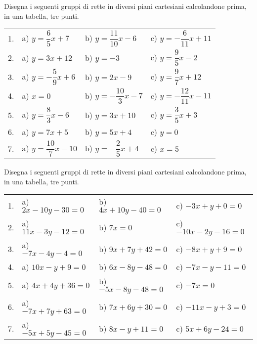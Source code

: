 \begin{esercizio}\label{ese:}
Disegna i seguenti gruppi di rette in diversi piani cartesiani 
calcolandone prima, in una tabella, tre punti.

\begin{tabular}{llll}
1. &
a) \quad \(y = \dfrac{6}{5} x +7\) & 
b) \quad \(y = \dfrac{11}{10} x -6\) & 
c) \quad \(y = -\dfrac{6}{11} x +11\) \\
2. &
a) \quad \(y = 3 x +12\) &   
b) \quad \(y = -3\) &
c) \quad \(y = \dfrac{9}{5} x -2\) \\
3. &
a) \quad \(y = -\dfrac{5}{9} x +6\) &   
b) \quad \(y = 2 x -9\) &
c) \quad \(y = \dfrac{9}{7} x +12\) \\
4. &
a) \quad \(x = 0\) &   
b) \quad \(y = -\dfrac{10}{3} x -7\) &
c) \quad \(y = -\dfrac{12}{11} x -11\) \\
5. &
a) \quad \(y = \dfrac{8}{3} x -6\) &   
b) \quad \(y = 3 x +10\) &
c) \quad \(y = \dfrac{3}{5} x +3\) \\
6. &
a) \quad \(y = 7 x +5\) &   
b) \quad \(y = 5 x +4\) &
c) \quad \(y = 0\) \\
7. &
a) \quad \(y = \dfrac{10}{7} x -10\) &   
b) \quad \(y = -\dfrac{2}{5} x +4\) &
c) \quad \(x = 5\) \\
\end{tabular}
\end{esercizio}

\vspace{-6pt}
\begin{esercizio}\label{ese:}
Disegna i seguenti gruppi di rette in diversi piani cartesiani 
calcolandone prima, in una tabella, tre punti.

\begin{tabular}{llll}
1. &
a) \quad \(2 x - 10 y - 30 = 0\) & 
b) \quad \(4 x + 10 y - 40 = 0\) & 
c) \quad \(-3 x + y + 0 = 0\) \\
2. &
a) \quad \(11 x - 3 y - 12 = 0\) &   
b) \quad \(7 x = 0\) &
c) \quad \(-10 x - 2 y - 16 = 0\) \\
3. &
a) \quad \(-7 x - 4 y - 4 = 0\) &   
b) \quad \(9 x + 7 y + 42 = 0\) &
c) \quad \(-8 x + y + 9 = 0\) \\
4. &
a) \quad \(10 x - y + 9 = 0\) &   
b) \quad \(6 x - 8 y - 48 = 0\) &
c) \quad \(-7 x - y - 11 = 0\) \\
5. &
a) \quad \(4 x + 4 y + 36 = 0\) &   
b) \quad \(-5 x - 8 y - 48 = 0\) &
c) \quad \(-7 x = 0\) \\
6. &
a) \quad \(-7 x + 7 y + 63 = 0\) &   
b) \quad \(7 x + 6 y + 30 = 0\) &
c) \quad \(-11 x - y + 3 = 0\) \\
7. &
a) \quad \(-5 x + 5 y - 45 = 0\) &   
b) \quad \(8 x - y + 11 = 0\) &
c) \quad \(5 x + 6 y - 24 = 0\) \\
\end{tabular}
\end{esercizio}


